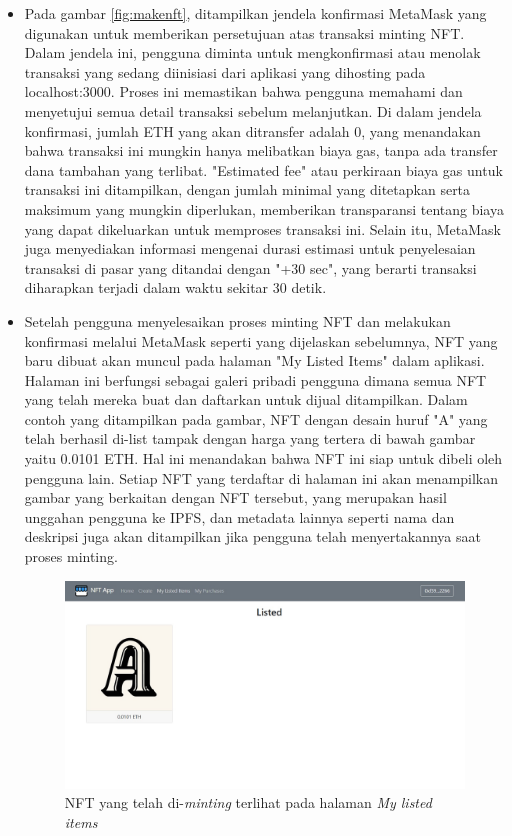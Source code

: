 \begin{itemize}
      \item 
      Pada gambar \ref{fig:makenft}, ditampilkan jendela konfirmasi MetaMask yang digunakan untuk memberikan persetujuan atas transaksi minting NFT. Dalam jendela ini, pengguna diminta untuk mengkonfirmasi atau menolak transaksi yang sedang diinisiasi dari aplikasi yang dihosting pada localhost:3000. Proses ini memastikan bahwa pengguna memahami dan menyetujui semua detail transaksi sebelum melanjutkan. Di dalam jendela konfirmasi, jumlah ETH yang akan ditransfer adalah 0, yang menandakan bahwa transaksi ini mungkin hanya melibatkan biaya gas, tanpa ada transfer dana tambahan yang terlibat. "Estimated fee" atau perkiraan biaya gas untuk transaksi ini ditampilkan, dengan jumlah minimal yang ditetapkan serta maksimum yang mungkin diperlukan, memberikan transparansi tentang biaya yang dapat dikeluarkan untuk memproses transaksi ini. Selain itu, MetaMask juga menyediakan informasi mengenai durasi estimasi untuk penyelesaian transaksi di pasar yang ditandai dengan "+30 sec", yang berarti transaksi diharapkan terjadi dalam waktu sekitar 30 detik.

      \item Setelah pengguna menyelesaikan proses minting NFT dan melakukan konfirmasi melalui MetaMask seperti yang dijelaskan sebelumnya, NFT yang baru dibuat akan muncul pada halaman "My Listed Items" dalam aplikasi. Halaman ini berfungsi sebagai galeri pribadi pengguna dimana semua NFT yang telah mereka buat dan daftarkan untuk dijual ditampilkan. Dalam contoh yang ditampilkan pada gambar, NFT dengan desain huruf "A" yang telah berhasil di-list tampak dengan harga yang tertera di bawah gambar yaitu 0.0101 ETH. Hal ini menandakan bahwa NFT ini siap untuk dibeli oleh pengguna lain. Setiap NFT yang terdaftar di halaman ini akan menampilkan gambar yang berkaitan dengan NFT tersebut, yang merupakan hasil unggahan pengguna ke IPFS, dan metadata lainnya seperti nama dan deskripsi juga akan ditampilkan jika pengguna telah menyertakannya saat proses minting.
      
      \begin{figure} [H] \centering
        \includegraphics[scale=0.26]{gambar/listed_nft.jpg}
        \caption{NFT yang telah di-\emph{minting} terlihat pada halaman \emph{My listed items}}
        \label{fig:listeditem}
        \end{figure}


\end{itemize}
